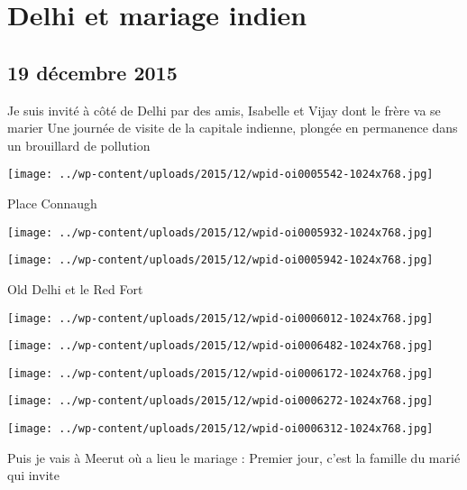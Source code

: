 \chapter{Delhi et mariage indien}
\section*{19 décembre 2015}
Je suis invité à côté de Delhi par des amis, Isabelle et Vijay dont le frère va se marier \newline
 Une journée de visite de la capitale indienne, plongée en permanence dans un brouillard de pollution \newline
 \newline
\centerline{\texttt{[image: ../wp-content/uploads/2015/12/wpid-oi0005542-1024x768.jpg]} } 
 \newline
 Place Connaugh \newline
 \newline
\centerline{\texttt{[image: ../wp-content/uploads/2015/12/wpid-oi0005932-1024x768.jpg]} } 
 \newline
 \newline
\centerline{\texttt{[image: ../wp-content/uploads/2015/12/wpid-oi0005942-1024x768.jpg]} } 
 \newline
 Old Delhi et le Red Fort \newline
 \newline
\centerline{\texttt{[image: ../wp-content/uploads/2015/12/wpid-oi0006012-1024x768.jpg]} } 
 \newline
 \newline
\centerline{\texttt{[image: ../wp-content/uploads/2015/12/wpid-oi0006482-1024x768.jpg]} } 
 \newline
 \newline
\centerline{\texttt{[image: ../wp-content/uploads/2015/12/wpid-oi0006172-1024x768.jpg]} } 
 \newline
 \newline
\centerline{\texttt{[image: ../wp-content/uploads/2015/12/wpid-oi0006272-1024x768.jpg]} } 
 \newline
 \newline
\centerline{\texttt{[image: ../wp-content/uploads/2015/12/wpid-oi0006312-1024x768.jpg]} } 
 \newline
 Puis je vais à Meerut où a lieu le mariage : \newline
 Premier jour, c'est la famille du marié qui invite \newline
